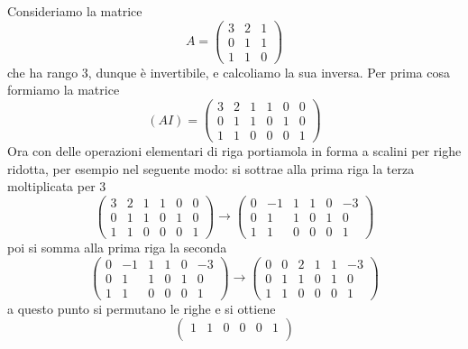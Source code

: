 \begin{example}
	Consideriamo la matrice
	\[
		A = \begin{pmatrix}
			3 & 2 & 1 \\
			0 & 1 & 1 \\
			1 & 1 & 0
		\end{pmatrix}
	\]
	che ha rango 3, dunque \`e invertibile, e calcoliamo la
	sua inversa. Per prima cosa formiamo la matrice
	\begin{equation*}
		(A I) = \begin{pmatrix}
			3 & 2 & 1 & 1 & 0 & 0 \\
			0 & 1 & 1 & 0 & 1 & 0 \\
			1 & 1 & 0 & 0 & 0 & 1
		\end{pmatrix}
	\end{equation*}
	Ora con delle operazioni elementari di riga portiamola in forma a scalini
	per righe ridotta, per esempio nel seguente modo: si sottrae alla prima riga
	la terza moltiplicata per 3
	\begin{equation*}
		\begin{pmatrix}
			3 & 2 & 1 & 1 & 0 & 0 \\
			0 & 1 & 1 & 0 & 1 & 0 \\
			1 & 1 & 0 & 0 & 0 & 1
		\end{pmatrix} \to
		\begin{pmatrix}
			0 & -1 & 1 & 1 & 0 & -3 \\
			0 & 1  & 1 & 0 & 1 & 0  \\
			1 & 1  & 0 & 0 & 0 & 1
		\end{pmatrix}
	\end{equation*}
	poi si somma alla prima riga la seconda
	\begin{equation*}
		\begin{pmatrix}
			0 & -1 & 1 & 1 & 0 & -3 \\
			0 & 1  & 1 & 0 & 1 & 0  \\
			1 & 1  & 0 & 0 & 0 & 1
		\end{pmatrix} \to
		\begin{pmatrix}
			0 & 0 & 2 & 1 & 1 & -3 \\
			0 & 1 & 1 & 0 & 1 & 0  \\
			1 & 1 & 0 & 0 & 0 & 1
		\end{pmatrix}
	\end{equation*}
	a questo punto si permutano le righe e si ottiene
	\begin{equation*}
		\begin{pmatrix}
			1 & 1 & 0 & 0 & 0 & 1  \\

\end{pmatrix}
\end{equation*}
\end{example}
